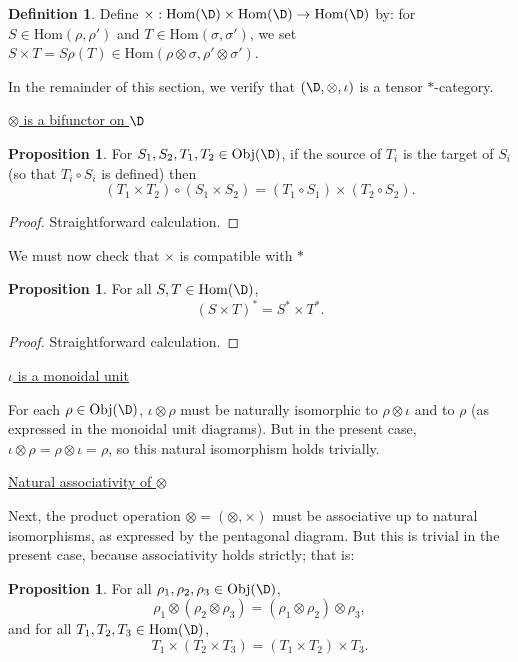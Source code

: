 \documentclass[12pt]{article}
\theoremstyle{definition}
\newtheorem{prop}[thm]{Proposition}
\theoremstyle{definition}
\newtheorem{defn}[thm]{Definition}
\theoremstyle{remark}
\newcommand{\Obj}{\mathrm{Obj}}
\newcommand{\Hom}{\mathrm{Hom}}
\begin{document}
\begin{defn} Define $\times :\Hom (\D )\times \Hom (\D )\to \Hom (\D )$ by: for $S\in
  \Hom (\rho ,\rho ')$ and $T\in \Hom (\sigma ,\sigma ')$, we set $S\times T=S\rho
  (T)\in \Hom (\rho \otimes \sigma ,\rho '\otimes \sigma ')$. \end{defn}

In the remainder of this section, we verify that $(\D,
\otimes ,\iota )$ is a tensor $*$-category.

\bigskip \noindent \underline{$\otimes$ is a bifunctor on $\D$} 

\smallskip \begin{prop} For $S_1,S_2,T_1,T_2\in \Obj (\D )$, if the source of $T_i$ is the
  target of $S_i$ (so that $T_i\circ S_i$ is defined) then
$$ (T_1\times T_2)\circ (S_1\times S_2) = (T_1\circ S_1)\times (T_2\circ S_2) .$$
\end{prop}

\begin{proof} Straightforward calculation.  \end{proof}

We must now check that $\times$ is compatible with $*$

\begin{prop} For all $S,T\in \Hom (\D )$,
$$ (S\times T)^*=S^*\times T^*. $$ \end{prop}

\begin{proof} Straightforward calculation.
\end{proof}

\bigskip \noindent \underline{$\iota$ is a monoidal unit}

\smallskip For each $\rho \in \Obj (\D )$, $\iota \otimes \rho$ must be naturally isomorphic to
$\rho \otimes \iota$ and to $\rho$ (as expressed in the monoidal unit diagrams).  But
in the present case, $\iota \otimes \rho =\rho \otimes \iota =\rho$, so this natural
isomorphism holds trivially.


\bigskip \noindent \underline{Natural associativity of $\otimes$}

\smallskip Next, the product operation $\otimes =(\otimes ,\times )$ must be associative up to
natural isomorphisms, as expressed by the pentagonal diagram.  But this is trivial in
the present case, because associativity holds strictly; that is:

  \begin{prop} For all $\rho _1,\rho _2,\rho _3\in \Obj (\D )$, $$\rho _1\otimes
    (\rho _2\otimes \rho _3)=(\rho _1\otimes \rho _2)\otimes \rho _3 ,$$ and for all
    $T_1,T_2,T_3\in \Hom (\D)$, $$ T_1\times (T_2\times T_3)=(T_1\times T_2)\times
    T_3.  $$ \end{prop}
\end{document}
